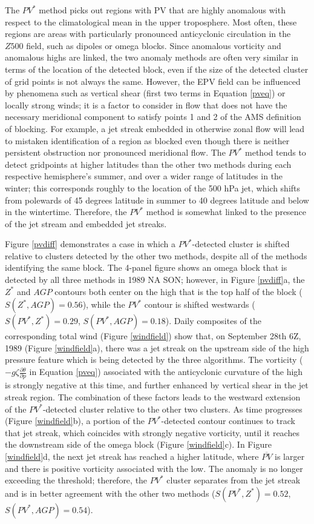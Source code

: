 \documentclass[smallextended]{svjour3}       %
\numberwithin{equation}{section}
\begin{document}
The $PV^*$ method picks out regions with PV that are highly anomalous with respect to the climatological mean in the upper troposphere. Most often, these regions are areas with particularly pronounced anticyclonic circulation in the $Z500$ field, such as dipoles or omega blocks. Since anomalous vorticity and anomalous highs are linked, the two anomaly methods are often very similar in terms of the location of the detected block, even if the size of the detected cluster of grid points is not always the same. However, the EPV field can be influenced by phenomena such as vertical shear (first two terms in Equation \ref{pveq}) or locally strong winds; it is a factor to consider in flow that does not have the necessary meridional component to satisfy points 1 and 2 of the AMS definition of blocking. For example, a jet streak embedded in otherwise zonal flow will lead to mistaken identification of a region as blocked even though there is neither persistent obstruction nor pronounced meridional flow. The $PV^*$ method tends to detect gridpoints at higher latitudes than the other two methods during each respective hemisphere's summer, and over a wider range of latitudes in the winter; this corresponds roughly to the location of the 500 hPa jet, which shifts from polewards of 45 degrees latitude in summer to 40 degrees latitude and below in the wintertime. Therefore, the $PV^*$ method is somewhat linked to the presence of the jet stream and embedded jet streaks.

Figure \ref{pvdiff} demonstrates a case in which a $PV^*$-detected cluster is shifted relative to clusters detected by the other two methods, despite all of the methods identifying the same block. The 4-panel figure shows an omega block that is detected by all three methods in 1989 NA SON; however, in Figure \ref{pvdiff}a, the $Z^*$ and $AGP$ contours both center on the high that is the top half of the block ($S(Z^*, AGP)=0.56$), while the $PV^*$ contour is shifted westwards ($S(PV^*, Z^*)=0.29$, $S(PV^*, AGP)=0.18$). Daily composites of the corresponding total wind (Figure \ref{windfield}) show that, on September 28th 6Z, 1989 (Figure \ref{windfield}a), there was a jet streak on the upstream side of the high pressure feature which is being detected by the three algorithms. The vorticity ($-g\zeta \frac{\partial \theta}{\partial p}$ in Equation \ref{pveq}) associated with the anticyclonic curvature of the high is strongly negative at this time, and further enhanced by vertical shear in the jet streak region. The combination of these factors leads to the westward extension of the $PV^*$-detected cluster relative to the other two clusters. As time progresses (Figure \ref{windfield}b), a portion of the  $PV^*$-detected contour continues to track that jet streak, which coincides with strongly negative vorticity, until it reaches the downstream side of the omega block (Figure \ref{windfield}c). In Figure \ref{windfield}d, the next jet streak has reached a higher latitude, where $\overline{PV}$ is larger and there is positive vorticity associated with the low. The anomaly is no longer exceeding the threshold; therefore, the $PV^*$ cluster separates from the jet streak and is in better agreement with the other two methods ($S(PV^*, Z^*)=0.52$, $S(PV^*, AGP)=0.54$). 
\end{document}
